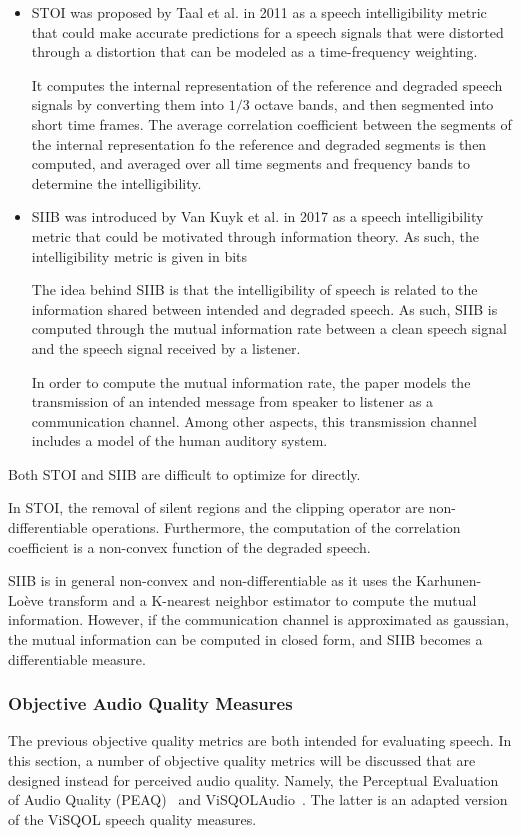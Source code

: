 \begin{itemize}
    \item 
STOI was proposed by Taal et al. in 2011 as a speech intelligibility metric that could make accurate predictions 
for a speech signals that were distorted through a distortion that can be modeled as a time-frequency weighting.

It computes the internal representation of the reference and degraded speech signals by converting them into $1/3$ 
octave bands, and then segmented into short time frames.
The average correlation coefficient between the segments of the internal representation fo the reference and degraded 
segments is then computed, and averaged over all time segments and frequency bands to determine the intelligibility.
~\cite{taal2011algorithm}
    \item 
SIIB was introduced by Van Kuyk et al. in 2017 as a speech intelligibility metric that could be motivated through
information theory.
As such, the intelligibility metric is given in bits

The idea behind SIIB is that the intelligibility of speech is related to the information shared between 
intended and degraded speech.
As such, SIIB is computed through the mutual information rate between a clean speech signal and the speech signal
received by a listener.

In order to compute the mutual information rate, the paper models the transmission of an intended message from 
speaker to listener as a communication channel.
Among other aspects, this transmission channel includes a model of the human auditory system.
~\cite{van2017instrumental}
\end{itemize}

Both STOI and SIIB are difficult to optimize for directly. 

In STOI, the removal of silent regions and the clipping operator are non-differentiable operations.
Furthermore, the computation of the correlation coefficient is a non-convex function of the degraded speech.

SIIB is in general non-convex and non-differentiable as it uses the Karhunen-Lo\`eve transform and a 
K-nearest neighbor estimator to compute the mutual information.
However, if the communication channel is approximated as gaussian, the mutual information can be computed in closed form,
and SIIB becomes a differentiable measure.

\subsubsection{Objective Audio Quality Measures}
The previous objective quality metrics are both intended for evaluating speech.
In this section, a number of objective quality metrics will be discussed that are designed instead 
for perceived audio quality.
Namely, the Perceptual Evaluation of Audio Quality (PEAQ)~\cite{thiede2000peaq} 
and ViSQOLAudio~\cite{hines2015visqolaudio}.
The latter is an adapted version of the ViSQOL speech quality measures.

